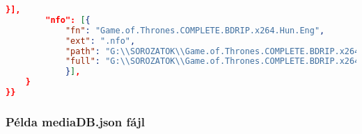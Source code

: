 \begin{lstlisting}[language={json}]
            }],
        "nfo": [{
            "fn": "Game.of.Thrones.COMPLETE.BDRIP.x264.Hun.Eng",
            "ext": ".nfo",
            "path": "G:\\SOROZATOK\\Game.of.Thrones.COMPLETE.BDRIP.x264.Hun.Eng",
            "full": "G:\\SOROZATOK\\Game.of.Thrones.COMPLETE.BDRIP.x264.Hun.Eng\\Game.of.Thrones.COMPLETE.BDRIP.x264.Hun.Eng.nfo"
            }],
    }
}}
\end{lstlisting}

\subsubsection{Példa mediaDB.json fájl}

